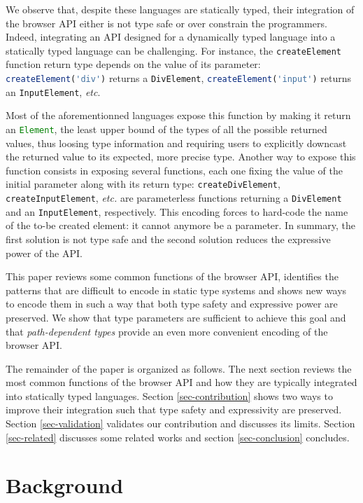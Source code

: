 \documentclass{llncs}
\newcommand{\jscode}[1]{\lstinline[language=JavaScript]|#1|}
\begin{document}
We observe that, despite these languages are statically typed, their integration of the browser API either is not type safe or over constrain the programmers. Indeed, integrating an API designed for a dynamically typed language into a statically typed language can be challenging. For instance, the \jscode{createElement} function return type depends on the value of its parameter: \jscode{createElement('div')} returns a \jscode{DivElement}, \jscode{createElement('input')} returns an \jscode{InputElement}, \emph{etc}.

Most of the aforementionned languages expose this function by making it return an \jscode{Element}, the least upper bound of the types of all the possible returned values, thus loosing type information and requiring users to explicitly downcast the returned value to its expected, more precise type. Another way to expose this function consists in exposing several functions, each one fixing the value of the initial parameter along with its return type: \jscode{createDivElement}, \jscode{createInputElement}, \emph{etc.} are parameterless functions returning a \jscode{DivElement} and an \jscode{InputElement}, respectively. This encoding forces to hard-code the name of the to-be created element: it cannot anymore be a parameter. In summary, the first solution is not type safe and the second solution reduces the expressive power of the API.

This paper reviews some common functions of the browser API, identifies the patterns that are difficult to encode in static type systems and shows new ways to encode them in such a way that both type safety and expressive power are preserved. We show that type parameters are sufficient to achieve this goal and that \emph{path-dependent types} provide an even more convenient encoding of the browser API.

The remainder of the paper is organized as follows. The next section reviews the most common functions of the browser API and how they are typically integrated into statically typed languages. Section \ref{sec-contribution} shows two ways to improve their integration such that type safety and expressivity are preserved. Section \ref{sec-validation} validates our contribution and discusses its limits. Section \ref{sec-related} discusses some related works and section \ref{sec-conclusion} concludes.

\section{Background}
\label{sec-background}
\end{document}
